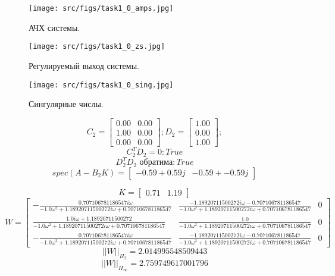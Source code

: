 \begin{figure}[ht!]
  \centering
  \texttt{[image: src/figs/task1\_0\_amps.jpg]}
  \caption{АЧХ системы.}
  \label{fig:task1_0_amps}
\end{figure}

\begin{figure}[ht!]
  \centering
  \texttt{[image: src/figs/task1\_0\_zs.jpg]}
  \caption{Регулируемый выход системы.}
  \label{fig:task1_0_zs}
\end{figure}

\begin{figure}[ht!]
  \centering
  \texttt{[image: src/figs/task1\_0\_sing.jpg]}
  \caption{Сингулярные числы.}
  \label{fig:task1_0_sing}
\end{figure}


\FloatBarrier
{}
\[C_2 = \begin{bmatrix}
  0.00 &  0.00\\
  1.00 &  0.00\\
  0.00 &  0.00
\end{bmatrix}; D_2 = \begin{bmatrix}
  1.00\\
  0.00\\
  1.00
\end{bmatrix};\]
\[C_2^T D_2 = 0: True\]
\[D_2^T D_2 \text{ обратима}: True\]
\[spec(A-B_2 K) = \begin{bmatrix}
 -0.59 + 0.59j & -0.59 + -0.59j
\end{bmatrix}\]

\[K = \begin{bmatrix}
  0.71 &  1.19
\end{bmatrix}\]
\[ W = \left[\begin{matrix}- \frac{0.707106781186547 i \omega}{- 1.0 \omega^{2} + 1.18920711500272 i \omega + 0.707106781186547} & \frac{- 1.18920711500272 i \omega - 0.707106781186547}{- 1.0 \omega^{2} + 1.18920711500272 i \omega + 0.707106781186547} & 0\\\frac{1.0 i \omega + 1.18920711500272}{- 1.0 \omega^{2} + 1.18920711500272 i \omega + 0.707106781186547} & \frac{1.0}{- 1.0 \omega^{2} + 1.18920711500272 i \omega + 0.707106781186547} & 0\\- \frac{0.707106781186547 i \omega}{- 1.0 \omega^{2} + 1.18920711500272 i \omega + 0.707106781186547} & \frac{- 1.18920711500272 i \omega - 0.707106781186547}{- 1.0 \omega^{2} + 1.18920711500272 i \omega + 0.707106781186547} & 0\end{matrix}\right]\]
\[||W||_{H_2} = 2.014995548509443\]
\[||W||_{H_\infty} = 2.759749617001796 \]

